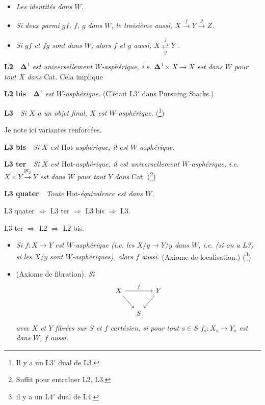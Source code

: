 \documentclass[11pt]{article}
\newcommand{\printedpage}[1]{\marginpar{\footnotesize p.~#1}}
\newcommand{\msp}[1]{\marginpar{\footnotesize [#1]}}
\begin{document}
\begin{itemize}[leftmargin=2.5em]
\item[a)] \textit{Les identités} \textit{dans $W$.}
\item[b)] \textit{Si deux parmi $gf$, $f$, $g$} \textit{dans $W$, le troisième aussi, $X \xrightarrow{f} Y \xrightarrow{g} Z$.}
\item[c)] \textit{Si $gf$ et $fg$ sont dans $W$, alors $f$ et $g$ aussi, $X \overset{f}{\underset{g}{\rightleftarrows}} Y$ .}
\end{itemize}

\noindent\textbf{L2}\ \ $\mathbf{\Delta}^1$ \textit{est universellement $W$-asphérique, i.e. $\mathbf{\Delta}^1 \times X \longrightarrow X$ est dans $W$ pour tout $X$ dans} Cat. Cela implique

\noindent\textbf{L2 bis}\ \ $\mathbf{\Delta}^1$ \textit{est $W$-asphérique.} (C'était L3$'$ dans Pursuing Stacks.)

\noindent\textbf{L3}\ \ \textit{Si $X$ a un objet final, $X$ est $W$-asphérique.} (\footnote[1]{Il y a un L3$'$ dual de L3.})

\noindent Je note ici variantes renforcées.

\noindent\textbf{L3 bis}\ \ \textit{Si $X$ est} Hot-\textit{asphérique, il est $W$-asphérique.}

\noindent\textbf{L3 ter}\ \ \textit{Si $X$ est} Hot-\textit{asphérique, il est universellement $W$-asphérique, i.e. $X \times Y \xrightarrow{\mathrm{pr}_2} Y$ est dans $W$ pour tout $Y$ dans} Cat. (\footnote[2]{Suffit pour entraîner L2, L3.})

\clearpage

\noindent\printedpage{2}
\textbf{L3 quater}\ \ \textit{Toute} Hot-\textit{équivalence est dans $W$.}

\noindent L3 quater $\Longrightarrow$ L3 ter $\Longrightarrow$ L3 bis $\Longrightarrow$ L3.

\noindent L3 ter $\Longrightarrow$ L2 $\Longrightarrow$ L2 bis.

\noindent\msp{page 2}

\begin{itemize}[leftmargin=2.5em]
\item[\textbf{L4}] \textit{Si $f : X \longrightarrow Y$ est $W$-asphérique (i.e. les $X/y \longrightarrow Y/y$ dans $W$, i.e. (si on a L3) si les $X/y$ sont $W$-asphériques), alors $f$ aussi.} (Axiome de localisation.) (\footnote[3]{il y a un L4$'$ dual de L4.})

\item[\textbf{L5}] (Axiome de fibration). \textit{Si}
\[
\begin{tikzcd}[column sep=small]
X \arrow[rr, "f"] \arrow[dr] & & Y \arrow[dl] \\
& S &
\end{tikzcd}
\]
\textit{avec $X$ et $Y$ fibrées sur $S$ et $f$ cartésien, si pour tout $s \in S$ $f_s : X_s \longrightarrow Y_s$ est dans $W$, $f$ aussi.}
\end{itemize}
\end{document}

